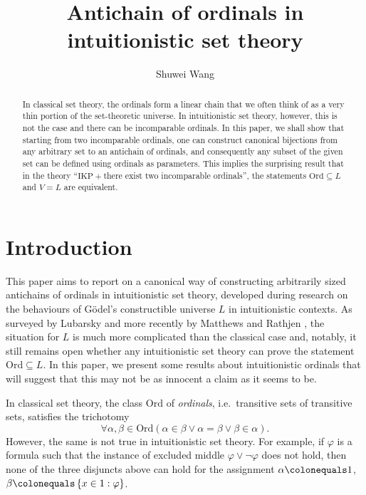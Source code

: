 \documentclass{asl}
\title{Antichain of ordinals in intuitionistic set theory}
\author{Shuwei Wang}
\theoremstyle{plain}
\newcommand{\Ord}{\mathrm{Ord}}
\begin{document}
\begin{abstract}
  In classical set theory, the ordinals form a linear chain that we often think of as a very thin portion of the set-theoretic universe. In intuitionistic set theory, however, this is not the case and there can be incomparable ordinals. In this paper, we shall show that starting from two incomparable ordinals, one can construct canonical bijections from any arbitrary set to an antichain of ordinals, and consequently any subset of the given set can be defined using ordinals as parameters. This implies the surprising result that in the theory ``$\mathrm{IKP} + {}$there exist two incomparable ordinals'', the statements $\Ord \subseteq L$ and $V = L$ are equivalent.
\end{abstract}

\maketitle

\section{Introduction}

This paper aims to report on a canonical way of constructing arbitrarily sized antichains of ordinals in intuitionistic set theory, developed during research on the behaviours of G\"odel's constructible universe $L$ in intuitionistic contexts. As surveyed by Lubarsky \cite{lubarsky93-intuitionistic-l} and more recently by Matthews and Rathjen \cite{matthews-rathjen24-constructible-universe}, the situation for $L$ is much more complicated than the classical case and, notably, it still remains open whether any intuitionistic set theory can prove the statement $\Ord \subseteq L$. In this paper, we present some results about intuitionistic ordinals that will suggest that this may not be as innocent a claim as it seems to be.

In classical set theory, the class $\Ord$ of \emph{ordinals}, i.e.\ transitive sets of transitive sets, satisfies the trichotomy
\[\forall \alpha, \beta \in \Ord \left(\alpha \in \beta \lor \alpha = \beta \lor \beta \in \alpha\right).\]
However, the same is not true in intuitionistic set theory. For example, if $\varphi$ is a formula such that the instance of excluded middle $\varphi \lor \neg \varphi$ does not hold, then none of the three disjuncts above can hold for the assignment $\alpha \colonequals 1$, $\beta \colonequals \left\{x \in 1 : \varphi\right\}$.
\end{document}
